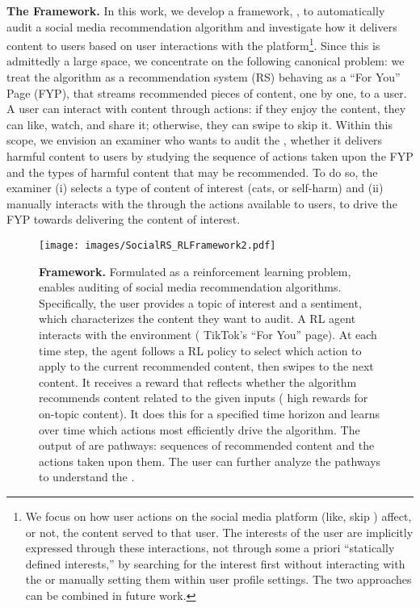 \textbf{The \autolike{} Framework.}
In this work, we develop a framework, \autolike{}, to automatically audit a social media recommendation algorithm and investigate how it delivers content to users based on user interactions with the platform\footnote{We focus on how user actions on the social media platform (\eg like, skip \etc) affect, or not, the content served to that user. The interests of the user are implicitly expressed through these interactions, not through some a priori ``statically defined interests,'' \eg{} by searching for the interest first without interacting with the \fyp{} or manually setting them within user profile settings. The two approaches can be combined in future work.\label{fn:user-actions}}.
Since this is admittedly a large space, we concentrate on the following canonical problem: we treat the algorithm as a recommendation system (RS) behaving as a ``For You'' Page (FYP), that streams recommended pieces of content, one by one, to a user. 
A user can interact with content through actions: if they enjoy the content, they can like, watch, and share it; otherwise, they can swipe to skip it. 
Within this scope, we envision an examiner who wants to audit the \rs{}, \eg{} whether it delivers harmful content to users by studying the sequence of actions taken upon the FYP and the types of harmful content that may be recommended. To do so, the examiner (i) selects a type of content of interest (\eg cats, or self-harm) and (ii) manually interacts with the \rs{} through the actions available to users, to drive the FYP towards delivering the content of interest.

\begin{figure*}[t!]
	\centering
\texttt{[image: images/SocialRS\_RLFramework2.pdf]}
	\caption{{\textbf{\autolike{} Framework.} Formulated as a reinforcement learning problem, \autolike{} enables auditing of social media recommendation algorithms. Specifically, the user provides a topic of interest and a sentiment, which characterizes the content they want to audit. A RL agent interacts with the environment (\eg{} TikTok's ``For You'' page). At each time step, the agent follows a RL policy to select which action to apply to the current recommended content, then swipes to the next content. It receives a reward that reflects whether the algorithm recommends content related to the given inputs (\eg{} high rewards for on-topic content). It does this for a specified time horizon and learns over time which actions most efficiently drive the algorithm. The output of \autolike{} are pathways: sequences of recommended content and the actions taken upon them. The user can further analyze the pathways to understand the \rs{}.
    }}
	\label{fig:autolike-framework}
\end{figure*}


